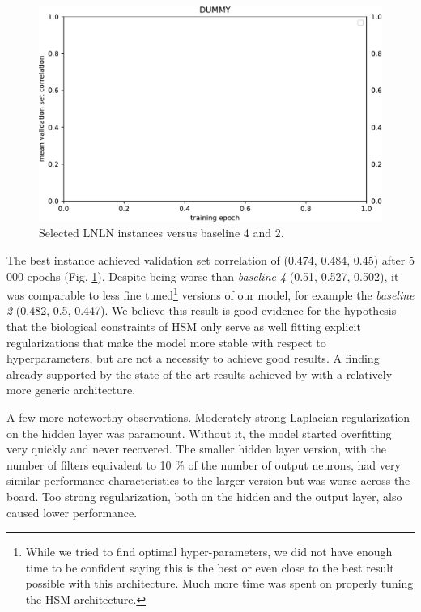 \begin{figure}[H]
    \centering
    \includegraphics[width=1\textwidth]{../figures/05_dummy}
    \caption[Experiment 5.2.1.1]{Selected LNLN instances versus baseline 4 and 2.}
    \label{fig:5.2.1.1}
\end{figure}

The best instance achieved validation set correlation of (0.474, 0.484, 0.45) after 5 000 epochs (Fig. \ref{fig:5.2.1.1}). Despite being worse than \textit{baseline 4} (0.51, 0.527, 0.502), it was comparable to less fine tuned\footnote{While we tried to find optimal hyper-parameters, we did not have enough time to be confident saying this is the best or even close to the best result possible with this architecture. Much more time was spent on properly tuning the HSM architecture.} versions of our model, for example the \textit{baseline 2} (0.482, 0.5, 0.447). We believe this result is good evidence for the hypothesis that the biological constraints of HSM only serve as well fitting explicit regularizations that make the model more stable with respect to hyperparameters, but are not a necessity to achieve good results. A finding already supported by the state of the art results achieved by \cite{klidnt} with a relatively more generic architecture.

A few more noteworthy observations. Moderately strong Laplacian regularization on the hidden layer was paramount. Without it, the model started overfitting very quickly and never recovered. The smaller hidden layer version, with the number of filters equivalent to 10 \% of the number of output neurons, had very similar performance characteristics to the larger version but was worse across the board. Too strong regularization, both on the hidden and the output layer, also caused lower performance.

